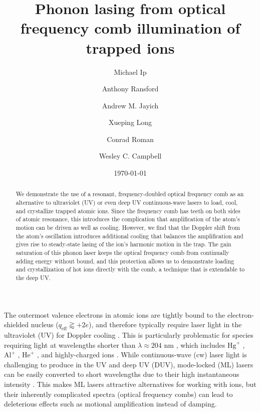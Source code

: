 \documentclass[preprint,superscriptaddress,amsmath,amssymb,aps,prl]{revtex4-1}
\begin{document}
\title{Phonon lasing from optical frequency comb illumination of trapped ions}

\author{Michael Ip}
\author{Anthony Ransford}
\author{Andrew M. Jayich}
\author{Xueping Long}
\author{Conrad Roman}
\author{Wesley C. Campbell}


\date{\today}

\begin{abstract}
We demonstrate the use of a resonant, frequency-doubled optical frequency comb as an alternative to ultraviolet (UV) or even deep UV continuous-wave lasers to load, cool, and crystallize trapped atomic ions.  Since the frequency comb has teeth on both sides of atomic resonance, this introduces the complication that amplification of the atom's motion can be driven as well as cooling.  However, we find that the Doppler shift from the atom's oscillation introduces additional cooling that balances the amplification and gives rise to steady-state lasing of the ion's harmonic motion in the trap.  The gain saturation of this phonon laser keeps the optical frequency comb from continually adding energy without bound, and this protection allows us to demonstrate loading and crystallization of hot ions directly with the comb, a technique that is extendable to the deep UV.
\end{abstract}

\maketitle

The outermost valence electrons in atomic ions are tightly bound to the electron-shielded nucleus ($q_\mathrm{eff} \gtrapprox +2e$), and therefore typically require laser light in the ultraviolet (UV) for Doppler cooling \cite{Wineland1975proposed,Hansch1975cooling,Neuhauser1978optical,Wineland1978radiation}.  This is particularly problematic for species requiring light at wavelengths shorter than $\lambda \approx 204 \mbox{ nm}$ \cite{Kato1986second}, which includes $\mathrm{Hg}^+$ \cite{Oskay2006singleatom,Rosenband2008frequency}, $\mathrm{Al}^+$ \cite{Schmidt2005spectroscopy,Dai2015vacuum}, $\mathrm{He}^+$ \cite{Herrmann2009feasibility,Cingoz2012direct}, and highly-charged ions \cite{Nauta2017towards}.  While continuous-wave (cw) laser light is challenging to produce in the UV and deep UV (DUV), mode-locked (ML) lasers can be easily converted to short wavelengths due to their high instantaneous intensity \cite{McPherson1987studies,Porat2017phase}. This makes ML lasers attractive alternatives for working with ions, but their inherently complicated spectra (optical frequency combs) can lead to deleterious effects such as motional amplification instead of damping.
\end{document}
